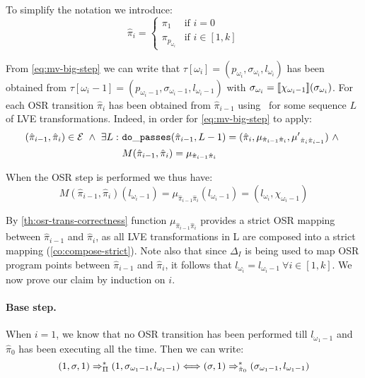 \begin{myproof}
To simplify the notation we introduce:
\begin{equation*}
\hat{\pi}_i = \begin{cases}
\pi_1 & \text{if } i=0\\
\pi_{p_{\omega_i}} & \text{if } i \in [1,k]
\end{cases}
\end{equation*}

\noindent From \ref{eq:mv-big-step} we can write that $\tau[\omega_i]=(p_{\omega_i}, \sigma_{\omega_i},l_{\omega_i})$ has been obtained from $\tau[\omega_i-1]=(p_{\omega_i-1}, \sigma_{\omega_i-1}, l_{\omega_i-1})$ with $\sigma_{\omega_i}=[\![\chi_{\omega_i-1}]\!](\sigma_{\omega_i})$. For each OSR transition $\hat{\pi}_i$ has been obtained from $\hat{\pi}_{i-1}$ using \dopasses\ for some sequence $L$ of LVE transformations. Indeed, in order for \ref{eq:mv-big-step} to apply:
\begin{align*}
(\hat{\pi}_{i-1},\hat{\pi}_i)\in{\cal E} ~\wedge~ \exists L: ~&{\tt do\_passes}(\hat{\pi}_{i-1}, L-1)=(\hat{\pi}_i,\mu_{\hat{\pi}_{i-1}\hat{\pi}_i},{\mu'}_{\hat{\pi}_{i}\hat{\pi}_{i-1}}) ~\wedge~\\
&M(\hat{\pi}_{i-1},\hat{\pi}_i)=\mu_{\hat{\pi}_{i-1}\hat{\pi}_i}
\end{align*}

\noindent When the OSR step is performed we thus have:
\begin{equation*}
M(\hat{\pi}_{i-1},\hat{\pi}_i)(l_{\omega_i-1})=\mu_{\hat{\pi}_{i-1}\hat{\pi}_i}(l_{\omega_i-1})=(l_{\omega_i},\chi_{\omega_i-1})
\end{equation*}

\noindent By \ref{th:osr-trans-correctness} function $\mu_{\hat{\pi}_{i-1}\hat{\pi}_i}$ provides a strict OSR mapping between $\hat{\pi}_{i-1}$ and $\hat{\pi}_i$, as all LVE transformations in L are composed into a strict mapping (\ref{co:compose-strict}). Note also that since $\Delta_I$ is being used to map OSR program points between $\hat{\pi}_{i-1}$ and $\hat{\pi}_i$, it follows that $l_{\omega_i}=l_{\omega_i-1}~\forall i\in[1,k]$.
We now prove our claim by induction on $i$.

\paragraph*{Base step.} When $i=1$, we know that no OSR transition has been performed till $l_{\omega_1-1}$ and $\hat{\pi}_0$ has been executing all the time. Then we can write:
\begin{equation*}
(1, \sigma, 1)\Rightarrow^*_{\Pi}(1,\sigma_{\omega_1-1},l_{\omega_1-1}) \Longleftrightarrow (\sigma, 1) \Rightarrow^*_{\hat{\pi}_0} (\sigma_{\omega_1-1},l_{\omega_1-1})
\end{equation*}


\end{myproof}
